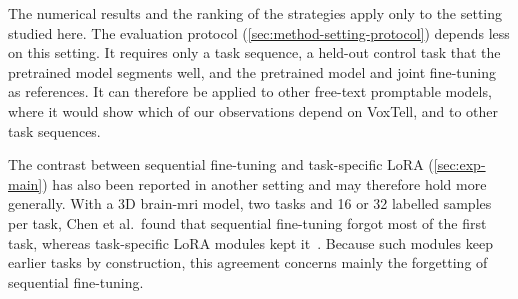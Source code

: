 The numerical results and the ranking of the strategies apply only to the setting studied here.
The evaluation protocol (\cref{sec:method-setting-protocol}) depends less on this setting.
It requires only a task sequence, a held-out control task that the pretrained model segments well, and the pretrained model and joint fine-tuning as references.
It can therefore be applied to other free-text promptable models, where it would show which of our observations depend on VoxTell, and to other task sequences.

The contrast between sequential fine-tuning and task-specific LoRA (\cref{sec:exp-main}) has also been reported in another setting and may therefore hold more generally.
With a 3D brain-\gls{mri} model, two tasks and 16 or 32 labelled samples per task, Chen et al.\ found that sequential fine-tuning forgot most of the first task, whereas task-specific LoRA modules kept it~\cite{chen2026fewshotcontinuallearning3d}.
Because such modules keep earlier tasks by construction, this agreement concerns mainly the forgetting of sequential fine-tuning.
